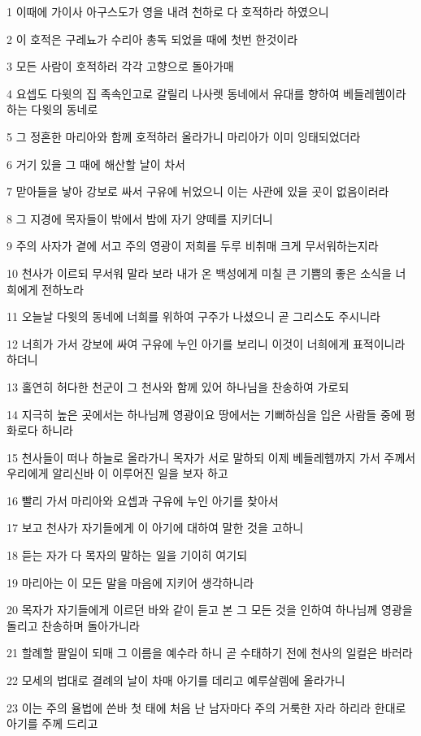 \par 1 이때에 가이사 아구스도가 영을 내려 천하로 다 호적하라 하였으니
\par 2 이 호적은 구레뇨가 수리아 총독 되었을 때에 첫번 한것이라
\par 3 모든 사람이 호적하러 각각 고향으로 돌아가매
\par 4 요셉도 다윗의 집 족속인고로 갈릴리 나사렛 동네에서 유대를 향하여 베들레헴이라 하는 다윗의 동네로
\par 5 그 정혼한 마리아와 함께 호적하러 올라가니 마리아가 이미 잉태되었더라
\par 6 거기 있을 그 때에 해산할 날이 차서
\par 7 맏아들을 낳아 강보로 싸서 구유에 뉘었으니 이는 사관에 있을 곳이 없음이러라
\par 8 그 지경에 목자들이 밖에서 밤에 자기 양떼를 지키더니
\par 9 주의 사자가 곁에 서고 주의 영광이 저희를 두루 비취매 크게 무서워하는지라
\par 10 천사가 이르되 무서워 말라 보라 내가 온 백성에게 미칠 큰 기쁨의 좋은 소식을 너희에게 전하노라
\par 11 오늘날 다윗의 동네에 너희를 위하여 구주가 나셨으니 곧 그리스도 주시니라
\par 12 너희가 가서 강보에 싸여 구유에 누인 아기를 보리니 이것이 너희에게 표적이니라 하더니
\par 13 홀연히 허다한 천군이 그 천사와 함께 있어 하나님을 찬송하여 가로되
\par 14 지극히 높은 곳에서는 하나님께 영광이요 땅에서는 기뻐하심을 입은 사람들 중에 평화로다 하니라
\par 15 천사들이 떠나 하늘로 올라가니 목자가 서로 말하되 이제 베들레헴까지 가서 주께서 우리에게 알리신바 이 이루어진 일을 보자 하고
\par 16 빨리 가서 마리아와 요셉과 구유에 누인 아기를 찾아서
\par 17 보고 천사가 자기들에게 이 아기에 대하여 말한 것을 고하니
\par 18 듣는 자가 다 목자의 말하는 일을 기이히 여기되
\par 19 마리아는 이 모든 말을 마음에 지키어 생각하니라
\par 20 목자가 자기들에게 이르던 바와 같이 듣고 본 그 모든 것을 인하여 하나님께 영광을 돌리고 찬송하며 돌아가니라
\par 21 할례할 팔일이 되매 그 이름을 예수라 하니 곧 수태하기 전에 천사의 일컬은 바러라
\par 22 모세의 법대로 결례의 날이 차매 아기를 데리고 예루살렘에 올라가니
\par 23 이는 주의 율법에 쓴바 첫 태에 처음 난 남자마다 주의 거룩한 자라 하리라 한대로 아기를 주께 드리고
